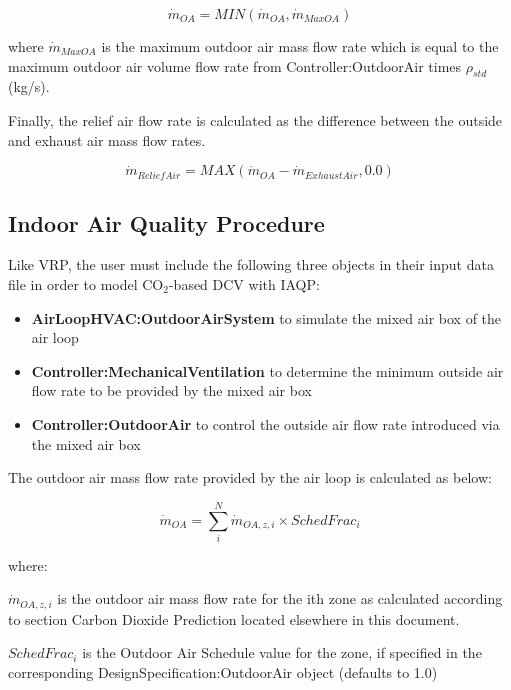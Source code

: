 \begin{equation}
{\dot m_{OA}} = MIN\left( {{{\dot m}_{OA}},{{\dot m}_{MaxOA}}} \right)
\end{equation}

where \({\dot m_{MaxOA}}\) is the maximum outdoor air mass flow rate which is equal to the maximum outdoor air volume flow rate from Controller:OutdoorAir times \({\rho_{std}}\) (kg/s).

Finally, the relief air flow rate is calculated as the difference between the outside and exhaust air mass flow rates.

\begin{equation}
{\dot m_{ReliefAir}} = MAX\left( {{{\dot m}_{OA}} - {{\dot m}_{ExhaustAir}},0.0} \right)
\end{equation}

\subsection{Indoor Air Quality Procedure}\label{indoor-air-quality-procedure}

Like VRP, the user must include the following three objects in their input data file in order to model CO\(_{2}\)-based DCV with IAQP:

\begin{itemize}
  \item \textbf{AirLoopHVAC:OutdoorAirSystem} to simulate the mixed air box of the air loop
  \item \textbf{Controller:MechanicalVentilation} to determine the minimum outside air flow rate to be provided by the mixed air box
  \item \textbf{Controller:OutdoorAir} to control the outside air flow rate introduced via the mixed air box
\end{itemize}

The outdoor air mass flow rate provided by the air loop is calculated as below:

\begin{equation}
{\dot m_{OA}} = \sum\limits_i^N {{{\dot m}_{OA,z,i}} \times {SchedFrac_i}}
\end{equation}

where:

\({\dot m_{OA,z,i}}\) is the outdoor air mass flow rate for the ith zone as calculated according to section Carbon Dioxide Prediction located elsewhere in this document.

\({SchedFrac_i}\) is the Outdoor Air Schedule value for the zone, if specified in the corresponding DesignSpecification:OutdoorAir object (defaults to 1.0)

